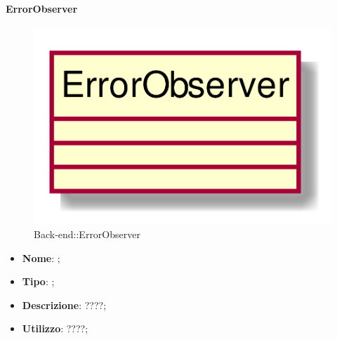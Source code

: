 \hypertarget{ErrorObserver_label}{\paragraph{ErrorObserver}}
\begin{figure}[h]
	\centering
	\includegraphics[width=\textwidth,height=\textheight,keepaspectratio]{images/ClassErrorObserver.png}
	\caption{Back-end::ErrorObserver}
\end{figure}
\begin{itemize}
	\item \textbf{Nome}: ;
	\item \textbf{Tipo}: ;
	\item \textbf{Descrizione}: ????;
	\item \textbf{Utilizzo}: ????;
\end{itemize}

